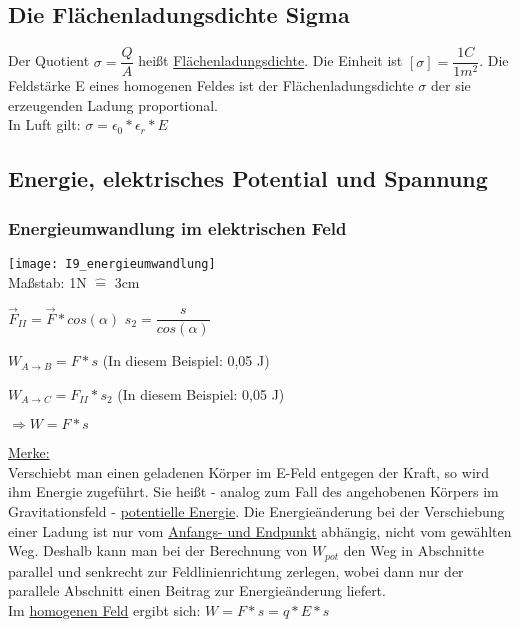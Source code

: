 \begin{tabular}{|l|l|l|}
\end{tabular}

\subsection{Die Flächenladungsdichte Sigma}
Der Quotient $ \sigma = \dfrac{Q}{A} $ heißt \underline{Flächenladungsdichte}. Die Einheit ist $ [\sigma] = \dfrac{1C}{1 m^{2}} $. \vspace{1mm} Die Feldstärke E eines homogenen Feldes ist der Flächenladungsdichte $ \sigma $ der sie erzeugenden Ladung proportional. \\
In Luft gilt: $ \sigma = \epsilon_{0} \ast \epsilon_{r} \ast E $

\vspace{10mm}

\subsection{Energie, elektrisches Potential und Spannung}
\subsubsection{Energieumwandlung im elektrischen Feld}
\texttt{[image: I9\_energieumwandlung]} \\
Maßstab: 1N $\hat{=}$ 3cm

\vspace{5mm}
$ \vec{F}_{II} = \vec{F} \ast cos(\alpha) $ \hspace{5mm} $ s_{2} = \dfrac{s}{cos(\alpha)} $

\vspace{2mm}
$ W_{A \rightarrow B} = F \ast s $ (In diesem Beispiel: 0,05 J)

\vspace{2mm}
$ W_{A \rightarrow C} = F_{II} \ast s_{2} $ (In diesem Beispiel: 0,05 J)

\vspace{2mm}
$ \Rightarrow W = F \ast s $	

\vspace{2mm}
\underline{Merke:} \\
Verschiebt man einen geladenen Körper im E-Feld entgegen der Kraft, so wird ihm Energie zugeführt. Sie heißt - analog zum Fall des angehobenen Körpers im Gravitationsfeld - \underline{potentielle Energie}. Die Energieänderung bei der Verschiebung einer Ladung ist nur vom \underline{Anfangs- und Endpunkt} abhängig, nicht vom gewählten Weg. Deshalb kann man bei der Berechnung von $W_{pot}$ den Weg in Abschnitte parallel und senkrecht zur Feldlinienrichtung zerlegen, wobei dann nur der parallele Abschnitt einen Beitrag zur Energieänderung liefert. \\
Im \underline{homogenen Feld} ergibt sich: $ W = F \ast s = q \ast E \ast s $ 

